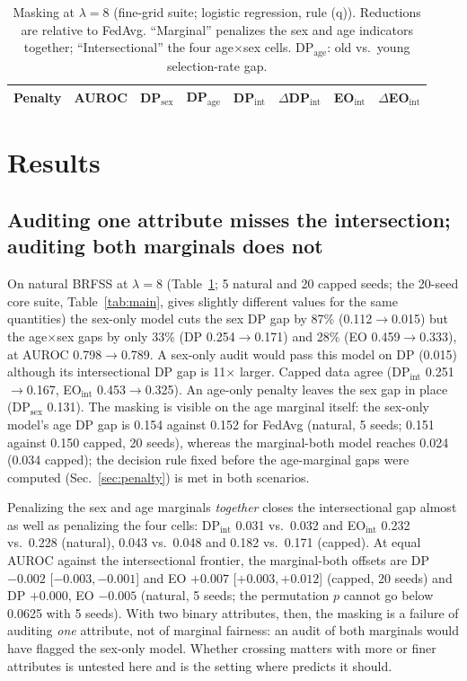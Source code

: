 
\begin{table}[t]
\centering
\caption{Masking at $\lambda{=}8$ (fine-grid suite; logistic regression, rule (q)). Reductions are relative to FedAvg. ``Marginal'' penalizes the sex and age indicators together; ``Intersectional'' the four age$\times$sex cells. DP$_\text{age}$: old vs.\ young selection-rate gap.}
\label{tab:mask}
\scriptsize
\setlength{\tabcolsep}{3pt}
\begin{tabular}{lccccccc}
\toprule
Penalty & AUROC & DP$_\text{sex}$ & DP$_\text{age}$ & DP$_\text{int}$ & $\Delta$DP$_\text{int}$ & EO$_\text{int}$ & $\Delta$EO$_\text{int}$\\
\midrule

\bottomrule
\end{tabular}
\end{table}

\section{Results}
\subsection{Auditing one attribute misses the intersection; auditing both marginals does not}
\label{sec:mask}
On natural BRFSS at $\lambda{=}8$ (Table~\ref{tab:mask}; 5 natural and 20 capped seeds; the 20-seed core suite, Table~\ref{tab:main}, gives slightly different values for the same quantities) the sex-only model cuts the sex DP gap by 87\% (0.112$\to$0.015) but the age$\times$sex gaps by only 33\% (DP 0.254$\to$0.171) and 28\% (EO 0.459$\to$0.333), at AUROC 0.798$\to$0.789. A sex-only audit would pass this model on DP (0.015) although its intersectional DP gap is 11$\times$ larger. Capped data agree (DP$_\text{int}$ 0.251$\to$0.167, EO$_\text{int}$ 0.453$\to$0.325). An age-only penalty leaves the sex gap in place (DP$_\text{sex}$ 0.131). The masking is visible on the age marginal itself: the sex-only model's age DP gap is 0.154 against 0.152 for FedAvg (natural, 5 seeds; 0.151 against 0.150 capped, 20 seeds), whereas the marginal-both model reaches 0.024 (0.034 capped); the decision rule fixed before the age-marginal gaps were computed (Sec.~\ref{sec:penalty}) is met in both scenarios.

Penalizing the sex and age marginals \emph{together} closes the intersectional gap almost as well as penalizing the four cells: DP$_\text{int}$ 0.031 vs.\ 0.032 and EO$_\text{int}$ 0.232 vs.\ 0.228 (natural), 0.043 vs.\ 0.048 and 0.182 vs.\ 0.171 (capped). At equal AUROC against the intersectional frontier, the marginal-both offsets are DP $-0.002$ [$-0.003,-0.001$] and EO $+0.007$ [$+0.003,+0.012$] (capped, 20 seeds) and DP $+0.000$, EO $-0.005$ (natural, 5 seeds; the permutation $p$ cannot go below 0.0625 with 5 seeds). With two binary attributes, then, the masking is a failure of auditing \emph{one} attribute, not of marginal fairness: an audit of both marginals would have flagged the sex-only model. Whether crossing matters with more or finer attributes is untested here and is the setting where \cite{kearns2018} predicts it should.

